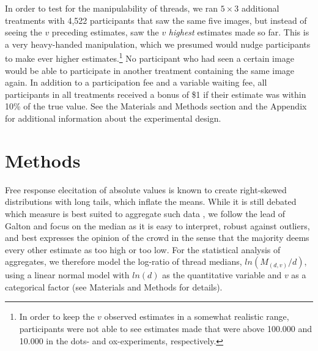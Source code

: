 \documentclass[9pt,twocolumn,twoside,lineno]{pnas-new}
\begin{document}
In order to test for the manipulability of threads, we ran $5 \times 3$ additional treatments with 4,522 participants that saw the same five images, but instead of seeing the $v$ preceding estimates, saw the $v$ \textit{highest} estimates made so far. This is a very heavy-handed manipulation, which we presumed would nudge participants to make ever higher estimates.\footnote{In order to keep the $v$ observed estimates in a somewhat realistic range, participants were not able to see estimates made that were above 100.000 and 10.000 in the  dots- and ox-experiments, respectively.} No participant who had seen a certain image would be able to participate in another treatment containing the same image again. In addition to a participation fee and a variable waiting fee, all participants in all treatments received a bonus of \$1 if their estimate was within 10\% of the true value. See the Materials and Methods section and the Appendix for additional information about the experimental design.

\section*{Methods}
Free response elecitation of absolute values is known to create right-skewed distributions with long tails, which inflate the means. While it is still debated which measure is best suited to aggregate such data \cite{kao2018counteracting}, we follow the lead of Galton \cite{galton1907vox} and focus on the median as it is easy to interpret, robust against outliers, and best expresses the opinion of the crowd in the sense that the majority deems every other estimate as too high or too low. For the statistical analysis of aggregates, we therefore model the log-ratio of thread medians, $ln(M_{(d,v)}/d)$, using a linear normal model with $ln(d)$ as the quantitative variable and $v$ as a categorical factor 
(see Materials and Methods for details). 
\end{document}
